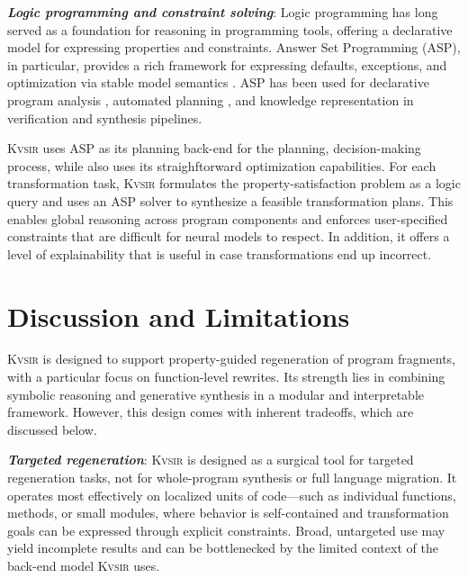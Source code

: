 \documentclass[sigplan]{acmart}
\newcommand{\sys}{{\scshape Kv{\textalpha}sir}\xspace}
\newcommand{\heading}[1]{\vspace{2pt}\noindent\textbf{\emph{#1}}:\enspace}
\begin{document}
\heading{Logic programming and constraint solving}
Logic programming has long served as a foundation for reasoning in programming
tools, offering a declarative model for expressing properties and constraints.
Answer Set Programming (ASP), in particular, provides a rich framework for
expressing defaults, exceptions, and optimization via stable model semantics
\cite{Gelfond_2000, Gelfond_2002, Eiter_2009}. ASP has been used for
declarative program analysis \cite{benton2007interactive}, automated planning
\cite{nguyen2020explainable, son2022answersetplanningsurvey}, and knowledge
representation in verification and synthesis pipelines.

\sys uses ASP as its planning back-end for the planning, decision-making
process, while also uses its straighftorward optimization capabilities.
For each transformation task, \sys formulates the property-satisfaction problem as a logic query and uses an ASP solver to
synthesize a feasible transformation plans.
This enables global reasoning across program components and enforces
user-specified constraints that are difficult for neural models to respect.
In addition, it offers a level of explainability that is useful in case transformations end up incorrect.

\section{Discussion and Limitations}

\sys is designed to support property-guided regeneration of program fragments, with a particular focus on function-level rewrites. Its strength lies in combining symbolic reasoning and generative synthesis in a modular and interpretable framework. However, this design comes with inherent tradeoffs, which are discussed below.

\heading{Targeted regeneration}
\sys is designed as a surgical tool for targeted regeneration tasks, not for whole-program synthesis or full language migration.
It operates most effectively on localized units of code---such as individual functions, methods, or small modules, where behavior is self-contained and transformation goals can be expressed through explicit constraints.
Broad, untargeted use may yield incomplete results and can be bottlenecked by the limited context of the back-end model \sys uses.
\end{document}
